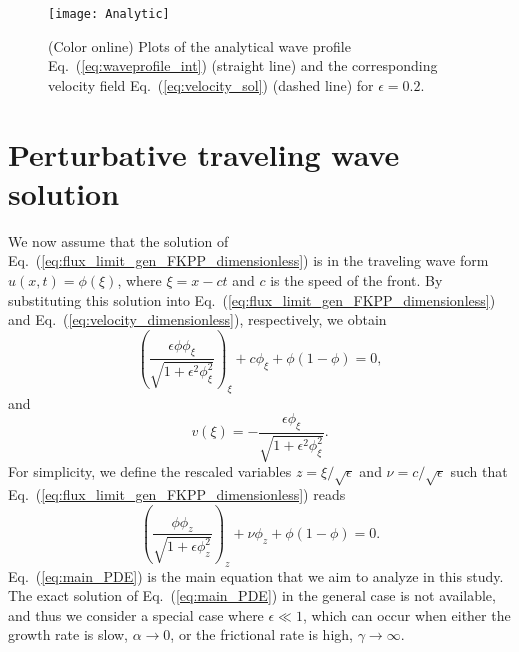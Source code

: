\documentclass[jkps,preprint,fleqn,showpacs,showkeys]{revtex4}
\newcommand{\eq}[1]{Eq.~(\ref{#1})}
\begin{document}
\begin{figure}[h]
\centering\texttt{[image: Analytic]}
\caption{\label{fig:analytic}
(Color online) Plots of the analytical wave profile \eq{eq:waveprofile_int} (straight line) and the corresponding velocity field \eq{eq:velocity_sol} (dashed line) for $\epsilon=0.2$.
}
\end{figure}

\section{Perturbative traveling wave solution \label{sec:Solution}}
We now assume that the solution of \eq{eq:flux_limit_gen_FKPP_dimensionless} is in the traveling wave form $u(x,t) = \phi(\xi)$, where $\xi=x-ct$ and $c$ is the speed of the front. By substituting this solution into \eq{eq:flux_limit_gen_FKPP_dimensionless} and \eq{eq:velocity_dimensionless}, respectively, we obtain
\begin{equation}\label{eq:traveling_wave1}
\left(\frac{\epsilon\phi \phi_\xi}{\sqrt{1+\epsilon^2 \phi_\xi^2}}\right)_\xi + c\phi_\xi + \phi\left(1-\phi\right) = 0,
\end{equation}
and 
\begin{equation}\label{eq:velocity_wave}
v(\xi) = -\frac{\epsilon\phi_\xi}{\sqrt{1+\epsilon^2 \phi_\xi^2}}.
\end{equation}
For simplicity, we define the rescaled variables $z = \xi/\sqrt{\epsilon}$ and $\nu = c/\sqrt{\epsilon}$ such that \eq{eq:flux_limit_gen_FKPP_dimensionless} reads
\begin{equation}\label{eq:main_PDE}
\left(\frac{\phi \phi_z}{\sqrt{1+\epsilon \phi_z^2}}\right)_z + \nu\phi_z + \phi\left(1-\phi\right) = 0.
\end{equation}
\eq{eq:main_PDE} is the main equation that we aim to analyze in this study. The exact solution of \eq{eq:main_PDE} in the general case is not available, and thus we consider a special case where $\epsilon \ll 1$, which can occur when either the growth rate is slow, $\alpha \to 0$, or the frictional rate is high, $\gamma \to \infty$. 
\end{document}
